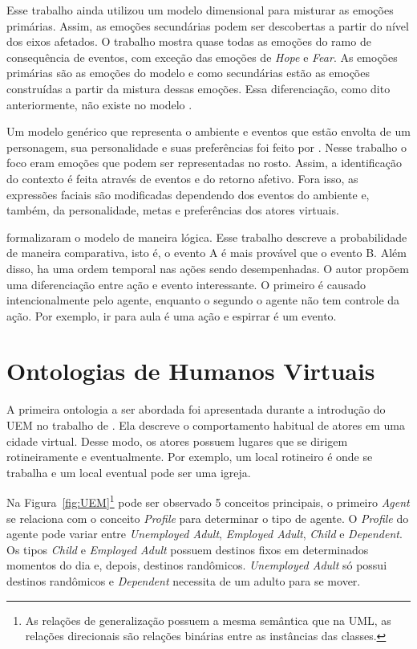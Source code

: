 Esse trabalho ainda utilizou um modelo dimensional para misturar as emoções
primárias. Assim, as emoções secundárias podem ser descobertas a partir do
nível dos eixos afetados. O trabalho mostra quase todas as emoções do
ramo de consequência de eventos, com exceção das emoções de \emph{Hope} e
\emph{Fear}. As emoções primárias são as emoções do modelo \occ e como
secundárias estão as emoções construídas a partir da mistura dessas emoções.
Essa diferenciação, como dito anteriormente, não existe no modelo \occ.

Um modelo genérico que representa o ambiente e eventos que estão envolta de um
personagem, sua personalidade e suas preferências foi feito por
\citet{lera2009semantic}. Nesse trabalho o foco eram emoções que podem ser
representadas no rosto. Assim, a identificação do contexto é feita através de
eventos e do retorno afetivo. Fora isso, as expressões faciais são modificadas
dependendo dos eventos do ambiente e, também, da personalidade, metas e
preferências dos atores virtuais.

\citet{adam2009alfototoe} formalizaram o modelo \occ de maneira lógica.
Esse trabalho descreve a probabilidade de maneira comparativa, isto é, o
evento A é mais provável que o evento B. Além disso, ha uma ordem temporal nas
ações sendo desempenhadas. O autor propõem uma diferenciação entre ação e
evento interessante. O primeiro é causado intencionalmente pelo agente\dev{},
enquanto o segundo o agente não tem controle da ação. Por exemplo, ir para
aula é uma ação e espirrar é um evento.

\section{Ontologias de Humanos Virtuais} \label{cap:eda:odhv}

A primeira ontologia a ser abordada foi apresentada durante a introdução do
UEM no trabalho de \citet{paiva2005ontology}. Ela descreve o comportamento
habitual de atores em uma cidade virtual. Desse modo, os atores possuem
lugares que se dirigem rotineiramente e eventualmente. Por exemplo, um local
rotineiro é onde se trabalha e um local eventual pode ser uma igreja.

Na Figura~\ref{fig:UEM}\footnote{As relações de generalização possuem a mesma
semântica que na UML, as relações direcionais são relações binárias entre as
instâncias das classes.} pode ser observado 5 conceitos principais, o primeiro
\emph{Agent} se relaciona com o conceito \emph{Profile} para determinar o tipo
de agente. O \emph{Profile} do agente pode variar entre \emph{Unemployed Adult},
\emph{Employed Adult}, \emph{Child} e \emph{Dependent}. \label{ex:tipos}Os tipos \emph{Child}
e \emph{Employed Adult} possuem destinos fixos em determinados momentos do dia
e, depois, destinos randômicos. \emph{Unemployed Adult} só possui destinos
randômicos e \emph{Dependent} necessita de um adulto para se mover.

